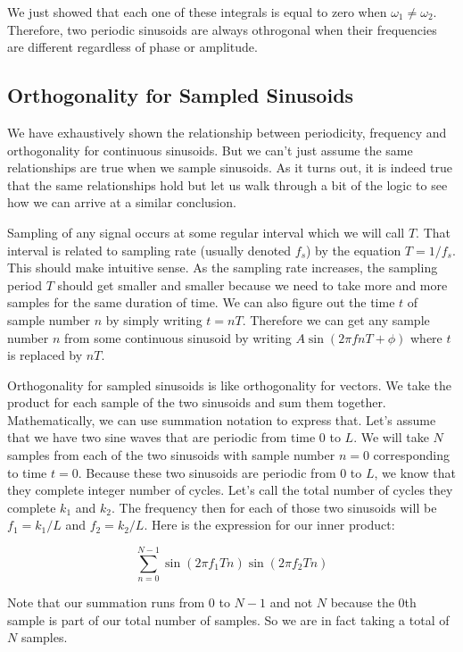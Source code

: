 	We just showed that each one of these integrals is equal to zero when $\omega_1 \neq \omega_2$.  Therefore,
	two periodic sinusoids are always othrogonal when their frequencies are different regardless of phase or amplitude.
	
	\subsection*{Orthogonality for Sampled Sinusoids}
	We have exhaustively shown the relationship between periodicity, frequency and orthogonality for continuous 
	sinusoids.  But we can't just assume the same relationships are true when we sample sinusoids.  As it turns out,
	it is indeed true that the same relationships hold but let us walk through a bit of the logic to see how we can arrive
	at a similar conclusion.
	
	Sampling of any signal occurs at some regular interval which we will call $T$.  That interval is related to sampling
	rate (usually denoted $f_s$) by the equation $T = 1/f_s$.  This should make intuitive sense.  As the sampling rate
	increases, the sampling period $T$ should get smaller and smaller because we need to take more and more samples
	for the same duration of time.  We can also figure out the time $t$ of sample number $n$ by simply writing 
	$t = nT$.  Therefore we can get any sample number $n$ from some continuous sinusoid by writing 
	$A\sin(2\pi f nT + \phi)$ where $t$ is replaced by $nT$.  
	
	Orthogonality for sampled sinusoids is like orthogonality for vectors.  We take the product for each sample of
	the two sinusoids and sum them together.  Mathematically, we can use summation notation to express that.  Let's
	assume that we have two sine waves that are periodic from time 0 to $L$.  We will take $N$ samples from each of
	the two sinusoids with sample number $n = 0$ corresponding to time $t = 0$.  Because these two sinusoids are
	periodic from 0 to $L$, we know that they complete integer number of cycles.  Let's call the total number of cycles
	they complete $k_1$ and $k_2$.  The frequency then for each of those two sinusoids will be $f_1 = k_1/L$ and
	$f_2 = k_2/L$.  Here is the expression for our inner product:
	
	\begin{equation}
		\label{eq:orthDiscrete}
		\sum_{n = 0}^{N-1}\sin(2\pi f_1Tn)\sin(2\pi f_2Tn)
	\end{equation}
	
	Note that our summation runs from 0 to $N-1$ and not $N$ because the 0th sample is part of our total number of
	samples.  So we are in fact taking a total of $N$ samples.
	
